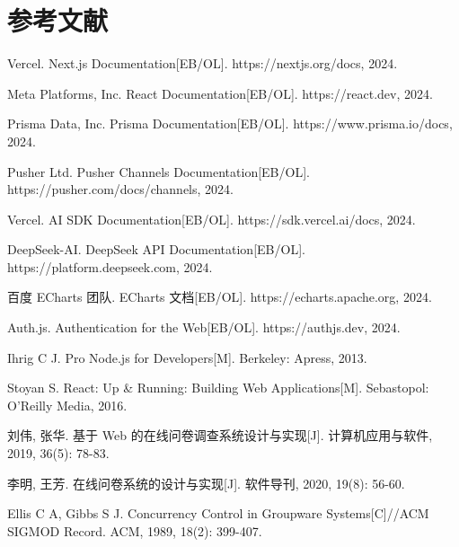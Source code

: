 \newpage
\section*{参考文献}

\begin{enumerate}[label={[\arabic*]}, leftmargin=2em]

\item Vercel. Next.js Documentation[EB/OL]. https://nextjs.org/docs, 2024.

\item Meta Platforms, Inc. React Documentation[EB/OL]. https://react.dev, 2024.

\item Prisma Data, Inc. Prisma Documentation[EB/OL]. https://www.prisma.io/docs, 2024.

\item Pusher Ltd. Pusher Channels Documentation[EB/OL]. https://pusher.com/docs/channels, 2024.

\item Vercel. AI SDK Documentation[EB/OL]. https://sdk.vercel.ai/docs, 2024.

\item DeepSeek-AI. DeepSeek API Documentation[EB/OL]. https://platform.deepseek.com, 2024.

\item 百度 ECharts 团队. ECharts 文档[EB/OL]. https://echarts.apache.org, 2024.

\item Auth.js. Authentication for the Web[EB/OL]. https://authjs.dev, 2024.

\item Ihrig C J. Pro Node.js for Developers[M]. Berkeley: Apress, 2013.

\item Stoyan S. React: Up \& Running: Building Web Applications[M]. Sebastopol: O'Reilly Media, 2016.

\item 刘伟, 张华. 基于 Web 的在线问卷调查系统设计与实现[J]. 计算机应用与软件, 2019, 36(5): 78-83.

\item 李明, 王芳. 在线问卷系统的设计与实现[J]. 软件导刊, 2020, 19(8): 56-60.

\item Ellis C A, Gibbs S J. Concurrency Control in Groupware Systems[C]//ACM SIGMOD Record. ACM, 1989, 18(2): 399-407.


\end{enumerate}
